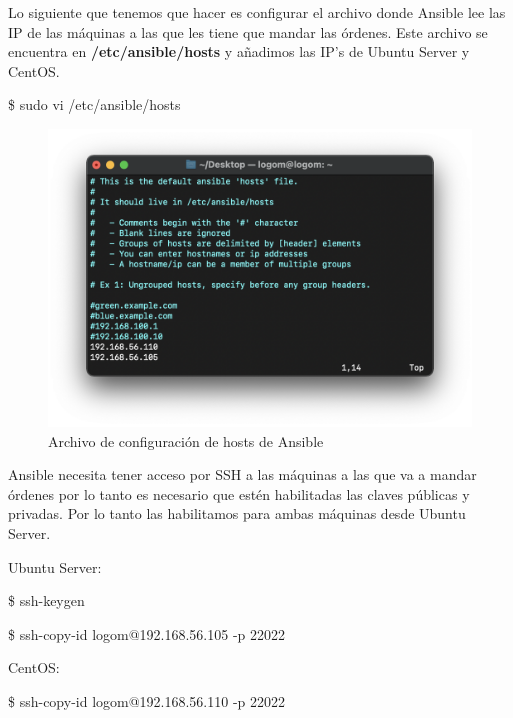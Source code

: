 Lo siguiente que tenemos que hacer es configurar el archivo donde Ansible lee las IP de las máquinas a las que les tiene que mandar las órdenes. Este archivo
se encuentra en \textbf{/etc/ansible/hosts} y añadimos las IP’s de Ubuntu Server y CentOS.
    \begin{tcolorbox}[colback=black!10, halign=left]
        \$ sudo vi /etc/ansible/hosts
    \end{tcolorbox}
    \begin{figure}[H]
        \centering
        \includegraphics[scale=0.525]{images/ansible_hosts.png}
        \caption{Archivo de configuración de hosts de Ansible}
        \label{fig:ansible_hosts}
    \end{figure}

Ansible necesita tener acceso por SSH a las máquinas a las que va a mandar órdenes por lo tanto es necesario que estén habilitadas las claves públicas y
privadas. Por lo tanto las habilitamos para ambas máquinas desde Ubuntu Server.

Ubuntu Server:
    \begin{tcolorbox}[colback=black!10, halign=left]
        \$ ssh-keygen
    \end{tcolorbox}
    \begin{tcolorbox}[colback=black!10, halign=left]
        \$ ssh-copy-id logom@192.168.56.105 -p 22022
    \end{tcolorbox}

CentOS:
    \begin{tcolorbox}[colback=black!10, halign=left]
        \$ ssh-copy-id logom@192.168.56.110 -p 22022
    \end{tcolorbox}

